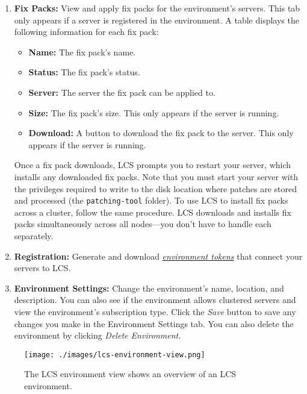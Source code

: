 \begin{enumerate}
\def\labelenumi{\arabic{enumi}.}
\item
  \textbf{Fix Packs:} View and apply fix packs for the environment's
  servers. This tab only appears if a server is registered in the
  environment. A table displays the following information for each fix
  pack:

  \begin{itemize}
  \tightlist
  \item
    \textbf{Name:} The fix pack's name.
  \item
    \textbf{Status:} The fix pack's status.
  \item
    \textbf{Server:} The server the fix pack can be applied to.
  \item
    \textbf{Size:} The fix pack's size. This only appears if the server
    is running.
  \item
    \textbf{Download:} A button to download the fix pack to the server.
    This only appears if the server is running.
  \end{itemize}

  Once a fix pack downloads, LCS prompts you to restart your server,
  which installs any downloaded fix packs. Note that you must start your
  server with the privileges required to write to the disk location
  where patches are stored and processed (the \texttt{patching-tool}
  folder). To use LCS to install fix packs across a cluster, follow the
  same procedure. LCS downloads and installs fix packs simultaneously
  across all nodes---you don't have to handle each separately.
\item
  \textbf{Registration:} Generate and download
  \href{/docs/7-2/deploy/-/knowledge_base/d/understanding-environment-tokens}{\emph{environment
  tokens}} that connect your servers to LCS.
\item
  \textbf{Environment Settings:} Change the environment's name,
  location, and description. You can also see if the environment allows
  clustered servers and view the environment's subscription type. Click
  the \emph{Save} button to save any changes you make in the Environment
  Settings tab. You can also delete the environment by clicking
  \emph{Delete Environment}.
\end{enumerate}

\begin{figure}
\centering
\texttt{[image: ./images/lcs-environment-view.png]}
\caption{The LCS environment view shows an overview of an LCS
environment.}
\end{figure}

